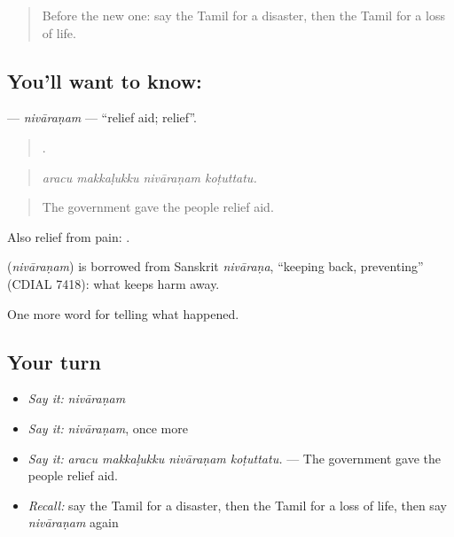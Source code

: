 \label{lesson:TA-C302-nivaranam}



\begin{quote}
Before the new one: say the Tamil for a disaster, then the Tamil for a loss of life.
\end{quote}

\subsection*{You'll want to know: }
\textbf{} — \emph{nivāraṇam} — \textquotedblleft{}relief aid; relief\textquotedblright{}.

\begin{quote}
   .
\end{quote}

\begin{quote}
\emph{aracu makkaḷukku nivāraṇam koṭuttatu.}
\end{quote}

\begin{quote}
The government gave the people relief aid.
\end{quote}

Also relief from pain:  .

\begin{cousinweb}
\textbf{} (\emph{nivāraṇam}) is borrowed from Sanskrit \emph{nivāraṇa}, \textquotedblleft{}keeping back, preventing\textquotedblright{} (CDIAL 7418): what keeps harm away.
\end{cousinweb}

\begin{grammarlens}[title={What you've built}]
One more word for telling what happened.
\end{grammarlens}

\subsection*{Your turn}
\begin{itemize}
\raggedright
  \item \emph{Say it:} \emph{nivāraṇam}
  \item \emph{Say it:} \emph{nivāraṇam}, once more
  \item \emph{Say it:} \emph{aracu makkaḷukku nivāraṇam koṭuttatu.} — The government gave the people relief aid.
  \item \emph{Recall:} say the Tamil for a disaster, then the Tamil for a loss of life, then say \emph{nivāraṇam} again
\end{itemize}

